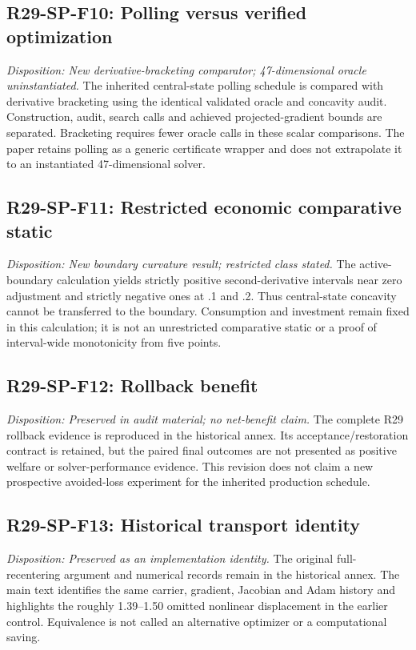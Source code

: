 \subsection{R29-SP-F10: Polling versus verified optimization}
\textit{Disposition: New derivative-bracketing comparator; 47-dimensional oracle uninstantiated.} The inherited central-state polling schedule is compared with derivative bracketing using the identical validated oracle and concavity audit. Construction, audit, search calls and achieved projected-gradient bounds are separated. Bracketing requires fewer oracle calls in these scalar comparisons. The paper retains polling as a generic certificate wrapper and does not extrapolate it to an instantiated 47-dimensional solver.
\subsection{R29-SP-F11: Restricted economic comparative static}
\textit{Disposition: New boundary curvature result; restricted class stated.} The active-boundary calculation yields strictly positive second-derivative intervals near zero adjustment and strictly negative ones at .1 and .2. Thus central-state concavity cannot be transferred to the boundary. Consumption and investment remain fixed in this calculation; it is not an unrestricted comparative static or a proof of interval-wide monotonicity from five points.
\subsection{R29-SP-F12: Rollback benefit}
\textit{Disposition: Preserved in audit material; no net-benefit claim.} The complete R29 rollback evidence is reproduced in the historical annex. Its acceptance/restoration contract is retained, but the paired final outcomes are not presented as positive welfare or solver-performance evidence. This revision does not claim a new prospective avoided-loss experiment for the inherited production schedule.
\subsection{R29-SP-F13: Historical transport identity}
\textit{Disposition: Preserved as an implementation identity.} The original full-recentering argument and numerical records remain in the historical annex. The main text identifies the same carrier, gradient, Jacobian and Adam history and highlights the roughly 1.39--1.50 omitted nonlinear displacement in the earlier control. Equivalence is not called an alternative optimizer or a computational saving.
